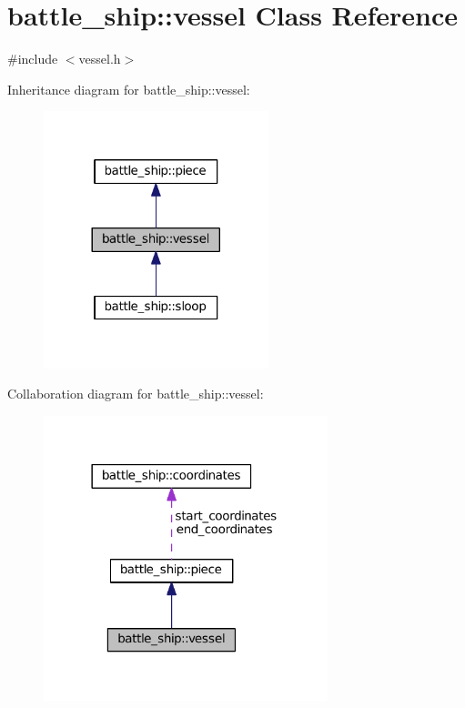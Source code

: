 \hypertarget{classbattle__ship_1_1vessel}{}\section{battle\+\_\+ship\+:\+:vessel Class Reference}
\label{classbattle__ship_1_1vessel}


{\ttfamily \#include $<$vessel.\+h$>$}



Inheritance diagram for battle\+\_\+ship\+:\+:vessel\+:
\nopagebreak
\begin{figure}[H]
\begin{center}
\leavevmode
\includegraphics[width=185pt]{classbattle__ship_1_1vessel__inherit__graph}
\end{center}
\end{figure}


Collaboration diagram for battle\+\_\+ship\+:\+:vessel\+:
\nopagebreak
\begin{figure}[H]
\begin{center}
\leavevmode
\includegraphics[width=234pt]{classbattle__ship_1_1vessel__coll__graph}
\end{center}
\end{figure}
